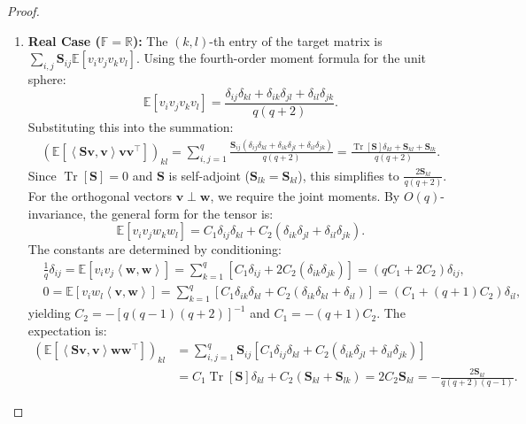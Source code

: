 \documentclass[noinfoline]{imsart}\setcounter{tocdepth}{2}
\renewcommand{\b}[1]{\mathbb{#1}} %
\newcommand{\m}[1]{\mathbf{#1}} %
\newcommand{\tr}[1]{\operatorname{Tr}\left[#1\right]}
\newcommand{\innpr}[2]{{\left\langle {#1},{#2}\right\rangle}} %
\theoremstyle{plain}
\begin{document}
\begin{appendix}
\begin{proof}
\begin{enumerate}[leftmargin = *]
\item \textbf{Real Case ($\b{F} = \b{R}$):}
The $(k,l)$-th entry of the target matrix is $\sum_{i,j} \m{S}_{ij} \b{E}[v_i v_j v_k v_l]$.
Using the fourth-order moment formula for the unit sphere:
\begin{equation*}
    \b{E} [v_{i} v_{j} v_{k} v_{l}] = \frac{\delta_{ij}\delta_{kl} + \delta_{ik}\delta_{jl} + \delta_{il}\delta_{jk}}{q(q+2)}.
\end{equation*}
Substituting this into the summation:
\begin{align*}
    \left( \b{E} [\innpr{\m{S}\m{v}}{\m{v}} \m{v} \m{v}^{\top}] \right)_{kl} = \sum_{i,j=1}^{q} \frac{\m{S}_{ij} (\delta_{ij}\delta_{kl} + \delta_{ik}\delta_{jl} + \delta_{il}\delta_{jk})}{q(q+2)} 
    = \frac{\tr{\m{S}}\delta_{kl} + \m{S}_{kl} + \m{S}_{lk}}{q(q+2)}.
\end{align*}
Since $\tr{\m{S}}=0$ and $\m{S}$ is self-adjoint ($\m{S}_{lk}=\m{S}_{kl}$), this simplifies to $\frac{2 \m{S}_{kl}}{q(q+2)}$.
For the orthogonal vectors $\m{v} \perp \m{w}$, we require the joint moments. By $O(q)$-invariance, the general form for the tensor is:
\begin{equation*}
    \b{E}[v_i v_j w_k w_l] = C_1 \delta_{ij}\delta_{kl} + C_2 (\delta_{ik}\delta_{jl} + \delta_{il}\delta_{jk}).
\end{equation*}
The constants are determined by conditioning:
\begin{align*}
    &\frac{1}{q} \delta_{ij} = \b{E}[v_i v_j \innpr{\m{w}}{\m{w}}] =  \sum_{k=1}^{q} [C_{1} \delta_{ij} + 2 C_2 (\delta_{ik}\delta_{jk})] = (q C_{1} + 2 C_2) \delta_{ij}, \\ 
    &0 = \b{E}[v_i w_l \innpr{\m{v}}{\m{w}}] = \sum_{k=1}^{q} [C_1 \delta_{ik}\delta_{kl} + C_2 (\delta_{ik}\delta_{kl} + \delta_{il})] = (C_{1} + (q+1) C_2) \delta_{il},
\end{align*}
yielding $C_2 = - [q(q-1)(q+2)]^{-1}$ and $C_1 = -(q+1)C_2$.
The expectation is:
\begin{align*}
    \left( \b{E} [\innpr{\m{S}\m{v}}{\m{v}} \m{w} \m{w}^{\top}] \right)_{kl} &= \sum_{i,j=1}^{q} \m{S}_{ij} [ C_1 \delta_{ij}\delta_{kl} + C_2 (\delta_{ik}\delta_{jl} + \delta_{il}\delta_{jk}) ] \\
    &= C_1 \tr{\m{S}} \delta_{kl} + C_2 (\m{S}_{kl} + \m{S}_{lk}) 
    = 2 C_2 \m{S}_{kl} = - \frac{2 \m{S}_{kl}}{q(q+2)(q-1)}.
\end{align*}


\end{enumerate}
\end{proof}
\end{appendix}
\end{document}
